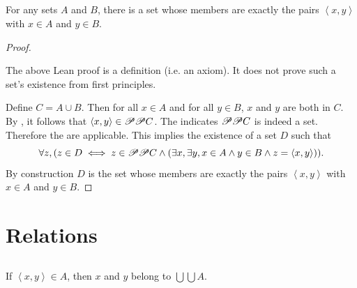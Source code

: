 \documentclass{report}
\newcommand{\pair}[1]{\left< #1 \right>}
\begin{document}
\subsection{}%

\begin{theorem}[3C]

  For any sets $A$ and $B$, there is a set whose members are exactly the
    pairs $\pair{x, y}$ with $x \in A$ and $y \in B$.

\end{theorem}

\begin{proof}


  \begin{note}
    The above Lean proof is a definition (i.e. an axiom).
    It does not prove such a set's existence from first principles.
  \end{note}

  Define $C = A \cup B$.
  Then for all $x \in A$ and for all $y \in B$, $x$ and $y$ are both in $C$.
  By , it follows that
    $\pair{x, y} \in \powerset{\powerset{C}}$.
  The  indicates $\mathscr{P}\mathscr{P}C$ is
    indeed a set.
  Therefore the  are applicable.
  This implies the existence of a set $D$ such that
    $$\forall z, (z \in D \iff z \in \powerset{\powerset{C}} \land
      (\exists x, \exists y, x \in A \land y \in B \land
        z = \pair{x, y})).$$
  By construction $D$ is the set whose members are exactly the pairs
    $\pair{x, y}$ with $x \in A$ and $y \in B$.

\end{proof}

\section{Relations}%

\subsection{}%

\begin{theorem}[3D]

  If $\pair{x, y} \in A$, then $x$ and $y$ belong to $\bigcup\bigcup A$.

\end{theorem}
\end{document}
